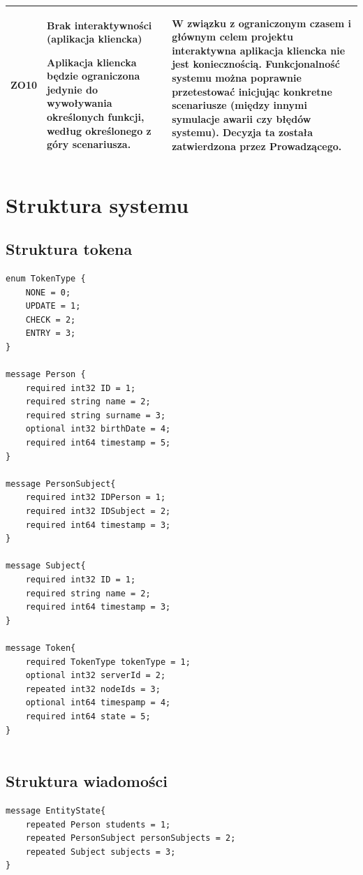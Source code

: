 {\begin{tabularx}{\textwidth}{|c|X|X|}
\label{z:ZO10} ZO10 &  \textbf{Brak interaktywności (aplikacja kliencka)}

Aplikacja kliencka będzie ograniczona jedynie do wywoływania określonych funkcji, według określonego z góry scenariusza. & 
W związku z ograniczonym czasem i głównym celem projektu interaktywna aplikacja kliencka nie jest koniecznością. Funkcjonalność systemu można poprawnie przetestować inicjując konkretne scenariusze (między innymi symulacje awarii czy błędów systemu). Decyzja ta została zatwierdzona przez Prowadzącego.\\
\hline

\end{tabularx}

\section[Struktura systemu]{Struktura systemu}

\subsection{Struktura tokena}
\begin{lstlisting}
enum TokenType {
    NONE = 0;
    UPDATE = 1;
    CHECK = 2;
    ENTRY = 3;
}

message Person {
	required int32 ID = 1;
	required string name = 2;
	required string surname = 3;
	optional int32 birthDate = 4;
	required int64 timestamp = 5;
}

message PersonSubject{
    required int32 IDPerson = 1;
    required int32 IDSubject = 2;
    required int64 timestamp = 3;
}

message Subject{
	required int32 ID = 1;
	required string name = 2;
	required int64 timestamp = 3;
}

message Token{
    required TokenType tokenType = 1;
	optional int32 serverId = 2;
	repeated int32 nodeIds = 3;
	optional int64 timespamp = 4;
	required int64 state = 5;
}


\end{lstlisting}

\subsection[Struktura wiadomości]{Struktura wiadomości}
\begin{lstlisting}
message EntityState{
    repeated Person students = 1;
    repeated PersonSubject personSubjects = 2;
    repeated Subject subjects = 3;
}


\end{lstlisting}}
